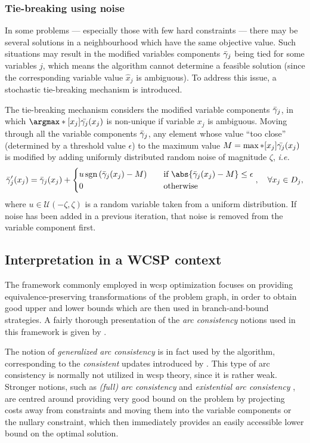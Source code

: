 \subsubsection{Tie-breaking using noise}
In some problems --- especially those with few hard constraints --- there may be several solutions in a neighbourhood which have the same objective value.
Such situations may result in the modified variables components \(\bar{\gamma}_j\) being tied for some variables \(j\), which means the algorithm cannot determine a feasible solution (since the corresponding variable value \(\hat{x}_j\) is ambiguous).
To address this issue, a stochastic tie-breaking mechanism is introduced.

The tie-breaking mechanism considers the modified variable components \(\bar{\gamma}_j\), in which \(\argmax*[x_j]{\bar{\vcomp_j}(x_j)}\) is non-unique if variable \(x_j\) is ambiguous.
Moving through all the variable components \(\bar{\gamma}_j\), any element whose value \enquote{too close} (determined by a threshold value \(\epsilon\)) to the maximum value \(M = \max*[x_j]{\bar{\ensuremath{\gamma}_j}(x_j)}\) is modified by adding uniformly distributed random noise of magnitude \(\zeta\), \emph{i.e.}
\begin{equation*}
	\bar{\vcomp}'_j(x_j) = \bar{\vcomp}_j(x_j) + \begin{cases}
		u \sgn{\bar{\vcomp}_j(x_j) - M} \quad & \text{if \(\abs{\bar{\vcomp}_j(x_j) - M} \leq \epsilon\)} \\
		0 & \text{otherwise}
	\end{cases}, \quad \forall x_j \in D_j,
\end{equation*}
where \(u \in \mathcal{U}(-\zeta,\zeta)\) is a random variable taken from a uniform distribution.
If noise has been added in a previous iteration, that noise is removed from the variable component first.

\subsection{Interpretation in a WCSP context}
The framework commonly employed in \gls{wcsp} optimization focuses on providing equivalence-preserving transformations of the problem graph, in order to obtain good upper and lower bounds which are then used in branch-and-bound strategies.
A fairly thorough presentation of the \emph{arc consistency} notions used in this framework is given by \textcite{Cooper10}.

The notion of \emph{generalized arc consistency} \parencite[\pno~7]{Cooper10} is in fact used by the algorithm, corresponding to the \emph{consistent} updates introduced by \parencite[\pno~101]{Wedelin08}.
This type of arc consistency is normally not utilized in \gls{wcsp} theory, since it is rather weak.
Stronger notions, such as \emph{(full) arc consistency} and \emph{existential arc consistency} \parencite{deGivry05}, are centred around providing very good bound on the problem by projecting costs away from constraints and moving them into the variable components or the nullary constraint, which then immediately provides an easily accessible lower bound on the optimal solution.

